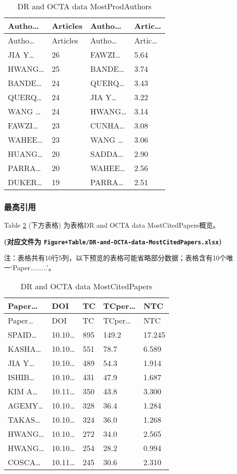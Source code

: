 \documentclass[
]{article}
\begin{document}
\begin{longtable}[]{@{}llll@{}}
\caption{\label{tab:DR-and-OCTA-data-MostProdAuthors}DR and OCTA data MostProdAuthors}\tabularnewline
\toprule
Autho\ldots{} & Articles & Autho\ldots{} & Artic\ldots{}\tabularnewline
\midrule
\endfirsthead
\toprule
Autho\ldots{} & Articles & Autho\ldots{} & Artic\ldots{}\tabularnewline
\midrule
\endhead
JIA Y\ldots{} & 26 & FAWZI\ldots{} & 5.64\tabularnewline
HWANG\ldots{} & 25 & BANDE\ldots{} & 3.74\tabularnewline
BANDE\ldots{} & 24 & QUERQ\ldots{} & 3.43\tabularnewline
QUERQ\ldots{} & 24 & JIA Y\ldots{} & 3.22\tabularnewline
WANG \ldots{} & 24 & HWANG\ldots{} & 3.14\tabularnewline
FAWZI\ldots{} & 23 & CUNHA\ldots{} & 3.08\tabularnewline
WAHEE\ldots{} & 23 & WANG \ldots{} & 3.06\tabularnewline
HUANG\ldots{} & 20 & SADDA\ldots{} & 2.90\tabularnewline
PARRA\ldots{} & 20 & WAHEE\ldots{} & 2.56\tabularnewline
DUKER\ldots{} & 19 & PARRA\ldots{} & 2.51\tabularnewline
\bottomrule
\end{longtable}

\hypertarget{ux6700ux9ad8ux5f15ux7528}{%
\subsubsection{最高引用}\label{ux6700ux9ad8ux5f15ux7528}}

Table \ref{tab:DR-and-OCTA-data-MostCitedPapers} (下方表格) 为表格DR and OCTA data MostCitedPapers概览。

\textbf{(对应文件为 \texttt{Figure+Table/DR-and-OCTA-data-MostCitedPapers.xlsx})}

\begin{center}\begin{tcolorbox}[colback=gray!10, colframe=gray!50, width=0.9\linewidth, arc=1mm, boxrule=0.5pt]注：表格共有10行5列，以下预览的表格可能省略部分数据；表格含有10个唯一`Paper.........'。
\end{tcolorbox}
\end{center}

\begin{longtable}[]{@{}lllll@{}}
\caption{\label{tab:DR-and-OCTA-data-MostCitedPapers}DR and OCTA data MostCitedPapers}\tabularnewline
\toprule
Paper\ldots{} & DOI & TC & TCper\ldots{} & NTC\tabularnewline
\midrule
\endfirsthead
\toprule
Paper\ldots{} & DOI & TC & TCper\ldots{} & NTC\tabularnewline
\midrule
\endhead
SPAID\ldots{} & 10.10\ldots{} & 895 & 149.2 & 17.245\tabularnewline
KASHA\ldots{} & 10.10\ldots{} & 551 & 78.7 & 6.589\tabularnewline
JIA Y\ldots{} & 10.10\ldots{} & 489 & 54.3 & 1.914\tabularnewline
ISHIB\ldots{} & 10.10\ldots{} & 431 & 47.9 & 1.687\tabularnewline
KIM A\ldots{} & 10.11\ldots{} & 350 & 43.8 & 3.300\tabularnewline
AGEMY\ldots{} & 10.10\ldots{} & 328 & 36.4 & 1.284\tabularnewline
TAKAS\ldots{} & 10.10\ldots{} & 324 & 36.0 & 1.268\tabularnewline
HWANG\ldots{} & 10.10\ldots{} & 272 & 34.0 & 2.565\tabularnewline
HWANG\ldots{} & 10.10\ldots{} & 254 & 28.2 & 0.994\tabularnewline
COSCA\ldots{} & 10.11\ldots{} & 245 & 30.6 & 2.310\tabularnewline
\bottomrule
\end{longtable}
\end{document}

